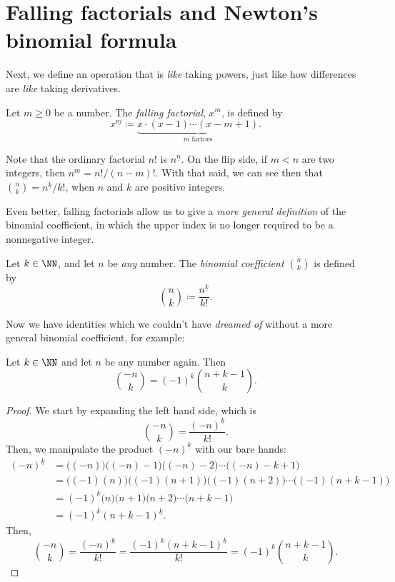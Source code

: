 \documentclass{article}
\newcommand{\ff}[2]{\ensuremath{#1^{\underline{#2}}}}
\begin{document}
\fi

\section{Falling factorials and Newton's binomial formula}

Next, we define an operation that is \textit{like} taking powers, just like how differences are \textit{like} taking derivatives.

\begin{definition}
    Let $m \geq 0$ be a number.
    The \textit{falling factorial}, $\ff{x}{m}$, is defined by
    \[
        \ff{x}{m} \coloneq \underbrace{x\cdot(x-1)\cdots(x-m+1)}_{m\text{ factors}}.
    \]
\end{definition}

Note that the ordinary factorial $n!$ is $\ff{n}{n}$.
On the flip side, if $m < n$ are two integers, then $\ff{n}{m} = n!/(n-m)!$.
With that said, we can see then that $\binom{n}{k} = \ff{n}{k}/k!$, when $n$ and $k$ are positive integers.

Even better, falling factorials allow us to give a \textit{more general definition} of the binomial coefficient, in which the upper index is no longer required to be a nonnegative integer.

\begin{definition}
    Let $k \in \NN$, and let $n$ be \textit{any} number.
    The \textit{binomial coefficient} $\binom{n}{k}$ is defined by
    \[
        \binom{n}{k} \coloneq \frac{\ff{n}{k}}{k!}.
    \]
\end{definition}

Now we have identities which we couldn't have \textit{dreamed of} without a more general binomial coefficient, for example:

\begin{lemma}
    Let $k \in \NN$ and let $n$ be any number again.
    Then
    \[
        \binom{-n}{k} = (-1)^k\binom{n+k-1}{k}.
    \]
\end{lemma}
\begin{proof}
    We start by expanding the left hand side, which is
    \[
        \binom{-n}{k} = \frac{\ff{(-n)}{k}}{k!}.
    \]
    Then, we manipulate the product $\ff{(-n)}{k}$ with our bare hands:
    \begin{align*}
        \ff{(-n)}{k} &= \Big((-n)\Big)\Big((-n)-1\Big)\Big((-n)-2\Big)\cdots\Big((-n)-k+1\Big) \\
                     &= \Big((-1)(n)\Big)\Big((-1)(n+1)\Big)\Big((-1)(n+2)\Big)\cdots\Big((-1)(n+k-1)\Big) \\
                     &= (-1)^k\Big(n\Big)\Big(n+1\Big)\Big(n+2\Big)\cdots\Big(n+k-1\Big) \\
                     &= (-1)^k\ff{(n+k-1)}{k}.
    \end{align*}
    Then,
    \[
    \binom{-n}{k} = \frac{\ff{(-n)}{k}}{k!} = \frac{(-1)^k\ff{(n+k-1)}{k}}{k!} = (-1)^k\binom{n+k-1}{k}.
    \]
\end{proof}
\end{document}
